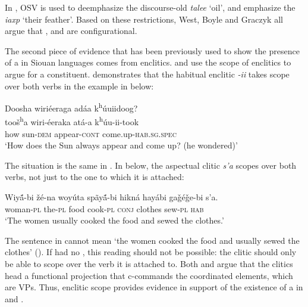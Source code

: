 \documentclass[output=paper]{LSP/langsci}
\begin{document}
In , OSV  is used to deemphasize the discourse-old  \textit{talee} `oil', and emphasize the  \textit{iaxp} `their feather'.  Based on these  restrictions, West, Boyle and Graczyk all argue that ,  and  are configurational. 
	
The second piece of evidence that has been previously used to show the presence of a  in Siouan languages comes from enclitics. \citet{West2003} and \citet{Boyle2007} use the scope of enclitics to argue for a  constituent. \citet{Boyle2007} demonstrates that the  habitual enclitic \textit{-ii} takes scope over both verbs in the example in  below:

\begin{exe}
\ex\label{ex:jrs:27} 
\glll Doosha	wiri\'eeraga 	ad\'aa 	 k\textsuperscript{h}\'uuiidoog?\\
too\v{s}\textsuperscript{h}a 	wiri-\'eeraka 	at\'a-a k\textsuperscript{h}\'uu-ii-took \\
how 	sun-\textsc{dem} 	appear-\textsc{cont}  come.up-\textsc{hab.sg.spec} \\
\trans `How does the Sun always appear and come up? (he wondered)' \citep[223]{Boyle2007}
\end{exe}

The situation is the same in .  In  below, the aspectual clitic \textit{s'a} scopes over both verbs, not just to the one to which it is attached:

\begin{exe}
\ex\label{ex:jrs:28} \gll Wiy\'{\~a}-bi 		\v{z}\'e-na 	woy\'uta 	sp\~ay\'{\~a}-bi 	hikn\'a 	hay\'abi 		ga\v{g}\'e\v{g}e-bi 	s'a. \\
woman-\textsc{pl} the-\textsc{pl} 	food 	cook-\textsc{pl} \textsc{conj} 	clothes 	sew-\textsc{pl} 	\textsc{hab} \\
\trans `The women usually cooked the food and sewed the clothes.' \citep[39]{West2003}
\end{exe}

The sentence in  cannot mean `the women cooked the food and usually sewed the clothes' (\citealt{West2003}).  If  had no , this reading should not be possible: the clitic should only be able to scope over the verb it is attached to. Both \citet{Boyle2007} and \citet{West2003} argue that the clitics head a functional projection that c-commands the coordinated elements, which are VPs.  Thus, enclitic scope provides evidence in support of the existence of a  in  and .
	
\end{document}
